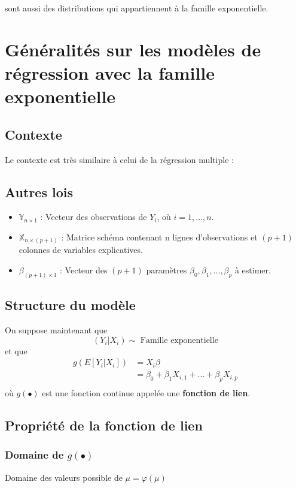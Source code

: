 \documentclass[11pt,french]{report}
\begin{document}
sont aussi des distributions qui appartiennent à la famille exponentielle.

\section{Généralités sur les modèles de régression avec la famille exponentielle}

\subsection{Contexte}
Le contexte est très similaire à celui de la régression multiple :
\subsection{Autres lois}
\begin{itemize}
\item $\mathbb{Y}_{n \times 1}$ : Vecteur des observations de $Y_i$, où $i = 1,...,n$.
\item $\mathbb{X}_{n \times (p+1)}$ : Matrice schéma contenant n lignes d'observations et $(p+1)$ colonnes de variables explicatives.
\item $\mathbb{\beta}_{(p+1) \times 1}$ : Vecteur des $(p+1)$ paramètres $\beta_0, \beta_1,...,\beta_p$ à estimer. 
\end{itemize}

\subsection{Structure du modèle}
On suppose maintenant que 
$$
(Y_i|X_i) \sim \text{ Famille exponentielle}
$$
et que
\begin{align*}
g(E[Y_i|X_i]) &= X_i\beta \\
&= \beta_0 + \beta_1X_{i,1} + ... + \beta_pX_{i,p}\\
\end{align*}
où $g(\bullet)$ est une fonction continue appelée une \textbf{fonction de lien}.

\subsection{Propriété de la fonction de lien}
\subsubsection{Domaine de $g(\bullet)$}
Domaine des valeurs possible de $\mu = \varphi(\mu)$ \newline
\end{document}
